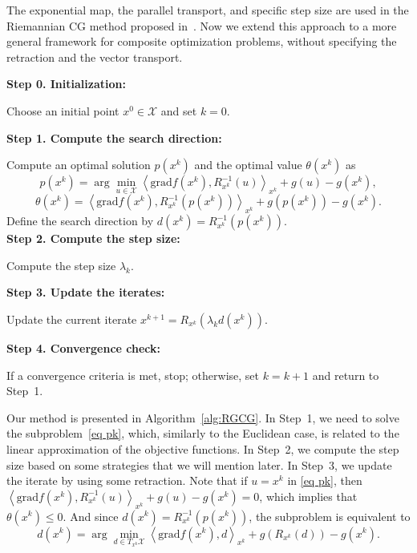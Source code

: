 \documentclass[pdflatex,sn-mathphys-num]{sn-jnl}%
\theoremstyle{definition} %
\theoremstyle{remark} %
\newcommand{\grad}{\mathrm{grad}}
\begin{document}
The exponential map, the parallel transport, and specific step size are used in the Riemannian CG method proposed in~\cite{weber_riemannian_2023}. Now we extend this approach to a more general framework for composite optimization problems, without specifying the retraction and the vector transport.
\begin{algorithm}[H]
    \caption{Riemannian generalized conditional gradient method (RGCG)}\label{alg:RGCG}
    
    \textbf{Step 0. Initialization:}
    
    \qquad Choose an initial point \(x^0 \in \mathcal{X}\) and set \(k = 0\).
     
    \textbf{Step 1. Compute the search direction:}
     
    \qquad Compute an optimal solution $p(x^k)$ and the optimal value $\theta(x^k)$ as
    \begin{equation}\label{eq pk}
     p(x^k) = \arg\min_{u \in \mathcal{X}}  \left\langle\grad f(x^k), R^{-1}_{x^k}(u)\right\rangle_{x^k}  +g(u) -g(x^k),
    \end{equation}
    \begin{equation}\label{def theta}
    \theta(x^k) =  \left\langle\grad f(x^k), R^{-1}_{x^k}(p(x^k)) \right\rangle_{x^k} +g(p(x^k)) -g(x^k).
    \end{equation} 
    \qquad Define the search direction by $d(x^k) = R^{-1}_{x^k}(p(x^k))$.\\
    \textbf{Step 2. Compute the step size:} 
    
    \qquad Compute the step size \( \lambda_k \). 

    \textbf{Step 3. Update the iterates:}
     
    \qquad Update the current iterate
     $x^{k+1} = R_{x^k} ( \lambda_k d(x^k)).$
       
    \textbf{Step 4. Convergence check:} 
     
    \qquad If a convergence criteria is met, stop; otherwise, set \( k = k + 1 \) and return to Step~1.
\end{algorithm}
Our method is presented in Algorithm~\ref{alg:RGCG}. In Step~1, we need to solve the subproblem~\eqref{eq pk}, which, similarly to the Euclidean case, is related to the linear approximation of the objective functions. In Step~2, we compute the step size based on some strategies that we will mention later. In Step~3, we update the iterate by using some retraction. Note that if \( u = x^k \) in \eqref{eq pk}, then \( \left\langle \grad f(x^k), R^{-1}_{x^k}(u) \right\rangle_{x^k} + g(u) - g(x^k) = 0 \), which implies that \(\theta(x^k) \leq 0\). And since $d(x^k) = R^{-1}_{x^k}(p(x^k))$, the subproblem is equivalent to
    \begin{equation}\label{eq dk}
         d(x^k) = \arg\min_{d \in T_{x^k}\mathcal{X}}  \left\langle\grad f(x^k), d\right\rangle_{x^k}  +g(R_{x^k}(d)) -g(x^k).
    \end{equation} 
\end{document}
